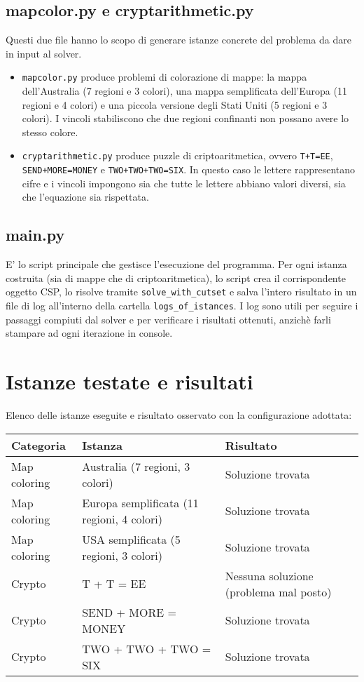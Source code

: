 \documentclass[a4paper,11pt]{article}
\begin{document}
\subsection*{mapcolor.py e cryptarithmetic.py}
Questi due file hanno lo scopo di generare istanze concrete del problema da dare in input al solver.  
\begin{itemize}
  \item \texttt{mapcolor.py} produce problemi di colorazione di mappe: la mappa dell’Australia (7 regioni e 3 colori), una mappa semplificata dell’Europa (11 regioni e 4 colori) e una piccola versione degli Stati Uniti (5 regioni e 3 colori). I vincoli stabiliscono che due regioni confinanti non possano avere lo stesso colore.
  \item \texttt{cryptarithmetic.py} produce puzzle di criptoaritmetica, ovvero \texttt{T+T=EE}, \texttt{SEND+MORE=MONEY} e \texttt{TWO+TWO+TWO=SIX}. In questo caso le lettere rappresentano cifre e i vincoli impongono sia che tutte le lettere abbiano valori diversi, sia che l’equazione sia rispettata.
\end{itemize}

\subsection*{main.py}
E' lo script principale che gestisce l’esecuzione del programma.  
Per ogni istanza costruita (sia di mappe che di criptoaritmetica), lo script crea il corrispondente oggetto CSP, lo risolve tramite \texttt{solve\_with\_cutset} e salva l’intero risultato in un file di log all’interno della cartella \texttt{logs\_of\_istances}. I log sono utili per seguire i passaggi compiuti dal solver e per verificare i risultati ottenuti, anzichè farli stampare ad ogni iterazione in console.


\section{Istanze testate e risultati}
Elenco delle istanze eseguite e risultato osservato con la configurazione adottata:

\begin{tabular}{@{}lll@{}}
\toprule
Categoria & Istanza & Risultato \\
\midrule
Map coloring & Australia (7 regioni, 3 colori) & Soluzione trovata \\
Map coloring & Europa semplificata (11 regioni, 4 colori) & Soluzione trovata \\
Map coloring & USA semplificata (5 regioni, 3 colori) & Soluzione trovata \\
Crypto & T + T = EE & Nessuna soluzione (problema mal posto) \\
Crypto & SEND + MORE = MONEY & Soluzione trovata \\
Crypto & TWO + TWO + TWO = SIX & Soluzione trovata \\
\bottomrule
\end{tabular}
\end{document}
